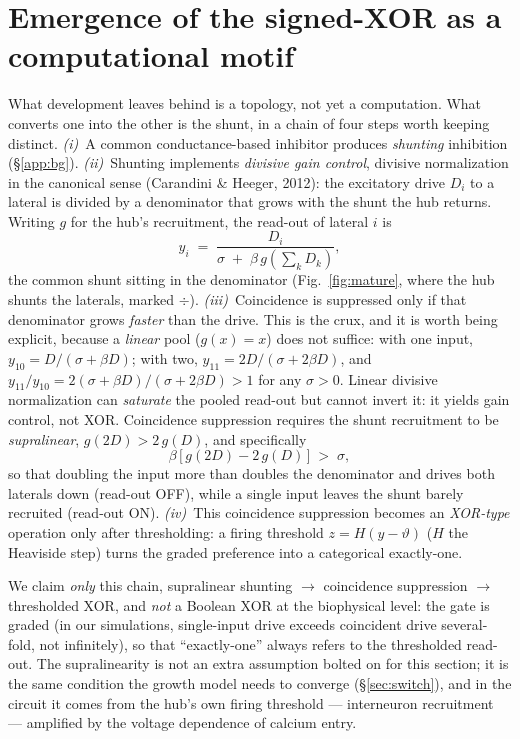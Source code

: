 \documentclass[11pt,a4paper]{article}
\begin{document}
\section{Emergence of the signed-XOR as a computational motif}\label{sec:compute}
What development leaves behind is a topology, not yet a computation. What converts one into the other is the shunt, in a chain of four steps worth keeping distinct. \emph{(i)}~A common conductance-based inhibitor produces \emph{shunting} inhibition (\S\ref{app:bg}). \emph{(ii)}~Shunting implements \emph{divisive gain control}, divisive normalization in the canonical sense (Carandini \& Heeger, 2012): the excitatory drive $D_i$ to a lateral is divided by a denominator that grows with the shunt the hub returns. Writing $g$ for the hub's recruitment, the read-out of lateral $i$ is
\begin{equation}
y_i \;=\; \frac{D_i}{\sigma \;+\; \beta\, g\!\left(\textstyle\sum_{k} D_k\right)},
\end{equation}
the common shunt sitting in the denominator (Fig.~\ref{fig:mature}, where the hub shunts the laterals, marked $\div$). \emph{(iii)}~Coincidence is suppressed only if that denominator grows \emph{faster} than the drive. This is the crux, and it is worth being explicit, because a \emph{linear} pool ($g(x)=x$) does not suffice: with one input, $y_{10}=D/(\sigma+\beta D)$; with two, $y_{11}=2D/(\sigma+2\beta D)$, and $y_{11}/y_{10}=2(\sigma+\beta D)/(\sigma+2\beta D)>1$ for any $\sigma>0$. Linear divisive normalization can \emph{saturate} the pooled read-out but cannot invert it: it yields gain control, not XOR. Coincidence suppression requires the shunt recruitment to be \emph{supralinear}, $g(2D)>2\,g(D)$, and specifically
\begin{equation}
\beta\,\big[\,g(2D) - 2\,g(D)\,\big] \;>\; \sigma,
\label{eq:xorcond}
\end{equation}
so that doubling the input more than doubles the denominator and drives both laterals down (read-out OFF), while a single input leaves the shunt barely recruited (read-out ON). \emph{(iv)}~This coincidence suppression becomes an \emph{XOR-type} operation only after thresholding: a firing threshold $z=H(y-\vartheta)$ ($H$ the Heaviside step) turns the graded preference into a categorical exactly-one.

We claim \emph{only} this chain, supralinear shunting $\to$ coincidence suppression $\to$ thresholded XOR, and \emph{not} a Boolean XOR at the biophysical level: the gate is graded (in our simulations, single-input drive exceeds coincident drive several-fold, not infinitely), so that ``exactly-one'' always refers to the thresholded read-out. The supralinearity is not an extra assumption bolted on for this section; it is the same condition the growth model needs to converge (\S\ref{sec:switch}), and in the circuit it comes from the hub's own firing threshold --- interneuron recruitment --- amplified by the voltage dependence of calcium entry.
\end{document}
